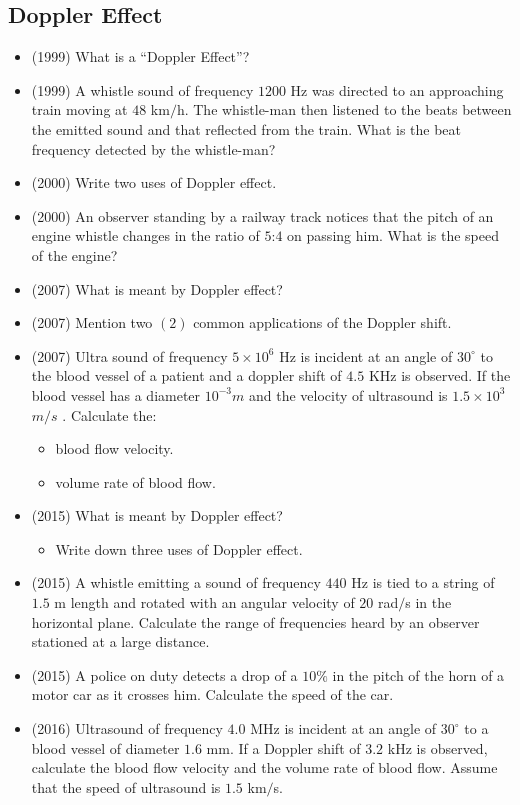 \documentclass{article}
\begin{document}
\subsection{Doppler Effect}
\begin{itemize}
\item (1999)  What is a “Doppler Effect”?
\item (1999)  A whistle sound of frequency $ 1200$ Hz was directed to an approaching train moving at $ 48$ km$/$h​ . The whistle-man then listened to the beats between the emitted sound and that reflected from the train. What is the beat frequency detected by the whistle-man?
\item (2000)  Write two uses of Doppler effect.
\item (2000)  An observer standing by a railway track notices that the pitch of an engine whistle changes in the ratio of $ 5$:$ 4$ on passing him. What is the speed of the engine?
\item (2007)  What is meant by Doppler effect? 
\item (2007)  Mention two $ (2)$ common applications of the Doppler shift. 
\item (2007)  Ultra sound of frequency $ 5 \times 10^{6}$ Hz is incident at an angle of $ 30^{\circ}$ to the blood vessel of a patient and a doppler shift of $ 4.5$ KHz is observed. If the blood vessel has a diameter $ 10^{-3}m$ and the velocity of ultrasound is $ 1.5 \times 10^{3}$  $ m/s$ . Calculate the:
 \begin{itemize}
\item blood flow velocity. 
\item volume rate of blood flow. 
\end{itemize}
\item (2015)  What is meant by Doppler effect?
 \begin{itemize}
\item Write down three uses of Doppler effect.
\end{itemize}
\item (2015)  A whistle emitting a sound of frequency $ 440$ Hz is tied to a string of $ 1.5$ m length and rotated with an angular velocity of $ 20$ rad$/$s in the horizontal plane.  Calculate the range of frequencies heard by an observer stationed at a large distance.
\item (2015)  A police on duty detects a drop of a $ 10\%$ in the pitch of the horn of a motor car as it crosses him. Calculate the speed of the car.
\item (2016)  Ultrasound of frequency $ 4.0$ MHz is incident at an angle of $ 30^{\circ}$ to a blood vessel of diameter $ 1.6$ mm.  If a Doppler shift of $ 3.2$ kHz is observed, calculate the blood flow velocity and the volume rate of blood flow.  Assume that the speed of ultrasound is $ 1.5$ km$/$s.

\end{itemize}
\end{document}
